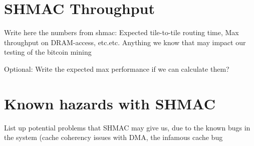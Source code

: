 
\section{SHMAC Throughput}
Write here the numbers from shmac: Expected tile-to-tile routing time, Max throughput on DRAM-access, etc.etc. Anything we know that may impact our testing of the bitcoin mining

Optional: Write the expected max performance if we can calculate them?

\section{Known hazards with SHMAC}
List up potential problems that SHMAC may give us, due to the known bugs in the system (cache coherency issues with DMA, the infamous cache bug



%




